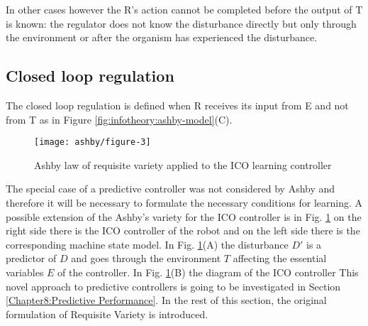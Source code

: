 In other cases however the R's action cannot be completed before the output of T
is known: the regulator does not know the disturbance directly but only through
the environment or after the organism has experienced the disturbance.


\subsection{Closed loop regulation}
The closed loop regulation is defined when R receives its input from E and not from T
as in Figure \ref{fig:infotheory:ashby-model}(C).
\begin{figure}
\begin{center}
\texttt{[image: ashby/figure-3]}
\caption[Ashby law in predictive controllers]{
Ashby law of requisite variety applied to the ICO learning controller
\label{fig:infotheory:ashby2}}
\end{center}
\end{figure}
The special case of a predictive controller was not considered by Ashby and therefore
it will be necessary to formulate the necessary conditions for learning.
A possible extension of the Ashby's variety for the ICO controller is in Fig. \ref{fig:infotheory:ashby2}
on the right side there is the ICO controller of the robot and on the left side
there is the corresponding machine state model.
In Fig. \ref{fig:infotheory:ashby2}(A) the disturbance $D'$ is a predictor of $D$ and goes
through the environment $T$ affecting the essential variables $E$ of the controller.
In Fig. \ref{fig:infotheory:ashby2}(B) the diagram of the ICO controller 
This novel approach to predictive controllers is going to be investigated in Section \ref{Chapter8:Predictive Performance}.
In the rest of this section, the original formulation of Requisite Variety is 
introduced.

